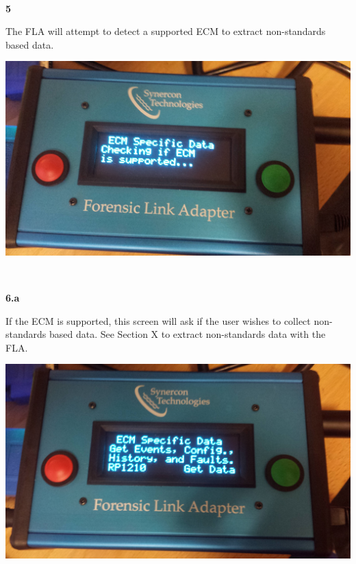 \documentclass[11pt]{article}
\begin{document}
\\[\baselineskip]
\noindent\begin{minipage}{0.3\textwidth}%
\begin{center}
\textbf{5}\\[\baselineskip]
\end{center}
The FLA will attempt to detect a supported ECM to extract non-standards based data.
\end{minipage}%
\hfill%
\begin{minipage}{0.6\textwidth}
\includegraphics[width=\linewidth]{./fla_screens/ecm_check}
\end{minipage}
\\[\baselineskip]
\noindent\begin{minipage}{0.3\textwidth}%
\begin{center}
\textbf{6.a}\\[\baselineskip]
\end{center}
If the ECM is supported, this screen will ask if the user wishes to collect non-standards based data. See Section X to extract non-standards data with the FLA.
\end{minipage}%
\hfill%
\begin{minipage}{0.6\textwidth}
\includegraphics[width=\linewidth]{./fla_screens/ecm_confirm}
\end{minipage}
\end{document}
